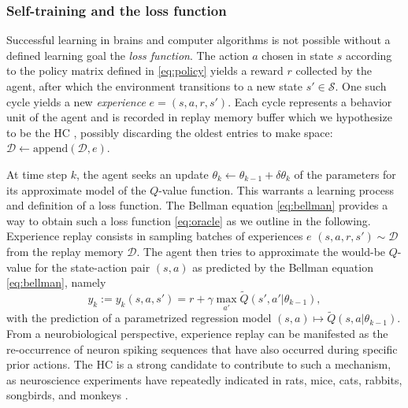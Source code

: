 \documentclass[10pt,letterpaper]{article}
\begin{document}
\subsubsection{Self-training and the loss function}
Successful learning in brains and computer algorithms is not possible without a
defined learning goal \textemdash the \textit{loss function}.
The action $a$ chosen in state $s$ according to the policy matrix defined in
\eqref{eq:policy} yields a reward $r$ collected by the agent,
after which the environment transitions to a new state $s' \in \mathcal S$.
One such cycle yields a new \textit{experience} $e = (s,a,r,s')$.
Each cycle represents a behavior unit of the agent
and is recorded in replay memory buffer \textemdash which we hypothesize to be the
HC \textemdash, possibly discarding the oldest entries to make space:
$\mathcal D \leftarrow \text{append}(\mathcal D, e)$.



At time step $k$, the agent seeks an update $\theta_{k} \leftarrow \theta_{k-1} + \delta \theta_{k}$ of the parameters for its approximate model of the $Q$-value function. This warrants a learning process
and definition of a loss function.
The Bellman equation \eqref{eq:bellman} provides a way to obtain such a loss function \eqref{eq:oracle} as we outline in the following.
Experience replay consists in sampling
batches of experiences $e$
$(s, a, r, s') \sim \mathcal D$ from the replay memory $\mathcal D$.
The agent then tries to approximate
the would-be $Q$-value for the state-action pair $(s,a)$ as predicted by the Bellman equation \eqref{eq:bellman}, namely
\begin{equation}
  y_k := y_k(s,a,s') =  r + \gamma \max_{a'} \tilde{Q}(s', a'|\theta_{k-1}),
\end{equation}
with the prediction of a parametrized regression model $(s,a)
\mapsto \tilde{Q}(s, a|\theta_{k-1})$.
From a neurobiological perspective,
experience replay can be manifested as the re-occurrence of
neuron spiking sequences that have also occurred during specific prior actions.
The HC is a strong candidate to contribute to such a mechanism,
as neuroscience experiments have repeatedly indicated
in rats, mice, cats, rabbits, songbirds, and
monkeys \citep{buhry2011,nokia2010,dave2000,skaggs2007}.
\end{document}
